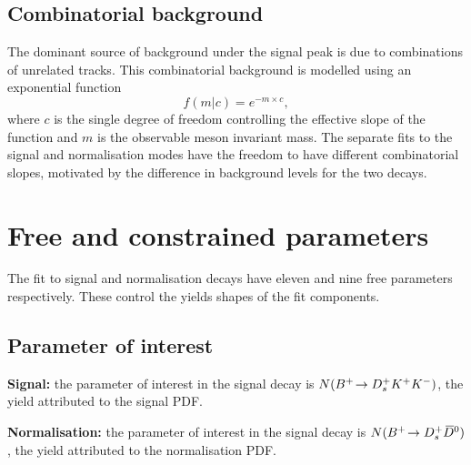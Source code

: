 \subsection{Combinatorial  background}
\label{sec:B2DsKK_combcomps}

The dominant source of background under the signal peak is due to combinations of unrelated tracks. This combinatorial background is modelled using an exponential function 
\begin{equation}
f(m|c) = e^{-m\times c},
\end{equation}
where $c$ is the single degree of freedom controlling the effective slope of the function and $m$ is the observable \Bp meson invariant mass. The separate fits to the signal and normalisation modes have the freedom to have different combinatorial slopes, motivated by the difference in background levels for the two decays.




\section{Free and constrained parameters}


The fit to signal and normalisation decays have eleven and nine free parameters respectively. These control the yields shapes of the fit components.  
\subsection{Parameter of interest}
\begin{description}
\item \textbf{Signal:} the parameter of interest in the signal decay is $N({{{B}^+}}\!\rightarrow {\ensuremath{{D}^+_{s}}}{\ensuremath{{K}^+}}{\ensuremath{{K}^-}})$, the yield attributed to the signal PDF.

\item \textbf{Normalisation:} the parameter of interest in the signal decay is $N({{{B}^+}}\!\rightarrow {\ensuremath{{D}^+_{s}}}{\ensuremath{{\kern 0.2em\overline{\kern -0.2em D}{}}{}^0}})$, the yield attributed to the normalisation PDF. 

\end{description}


